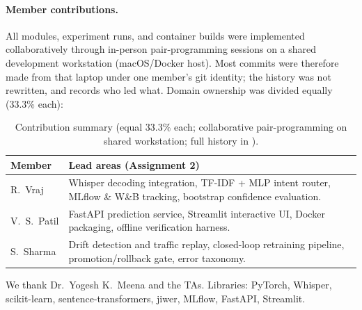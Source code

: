 \documentclass[sigconf,authordraft]{acmart}
\begin{document}
\paragraph{Member contributions.}
All modules, experiment runs, and container builds were implemented collaboratively through in-person pair-programming sessions on a shared development workstation (macOS/Docker host). Most commits were therefore made from that laptop under one member's git identity; the history was not rewritten, and  records who led what. Domain ownership was divided equally (33.3\% each):
\begin{table}[htbp]
\caption{Contribution summary (equal 33.3\% each; collaborative pair-programming on shared workstation; full history in ).}\label{tab:contrib}
\begin{tabular}{p{1.2cm}p{5.8cm}}
\toprule Member & Lead areas (Assignment 2) \\ \midrule
R.\ Vraj & Whisper decoding integration, TF-IDF + MLP intent router, MLflow \& W\&B tracking, bootstrap confidence evaluation. \\ V.\ S.\ Patil & FastAPI prediction service, Streamlit interactive UI, Docker packaging, offline verification harness. \\ S.\ Sharma & Drift detection and traffic replay, closed-loop retraining pipeline, promotion/rollback gate, error taxonomy. \\ \bottomrule
\end{tabular}
\end{table}
\begin{acks}
We thank Dr.\ Yogesh K.\ Meena and the TAs. Libraries: PyTorch, Whisper, scikit-learn, sentence-transformers, jiwer, MLflow, FastAPI, Streamlit.
\end{acks}



\appendix
\end{document}
